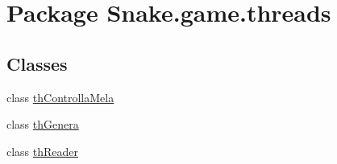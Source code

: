 \hypertarget{namespace_snake_1_1game_1_1threads}{}\section{Package Snake.\+game.\+threads}
\label{namespace_snake_1_1game_1_1threads}
\subsection*{Classes}
\begin{DoxyCompactItemize}
\item 
class \mbox{\hyperlink{class_snake_1_1game_1_1threads_1_1th_controlla_mela}{th\+Controlla\+Mela}}
\item 
class \mbox{\hyperlink{class_snake_1_1game_1_1threads_1_1th_genera}{th\+Genera}}
\item 
class \mbox{\hyperlink{class_snake_1_1game_1_1threads_1_1th_reader}{th\+Reader}}
\end{DoxyCompactItemize}
